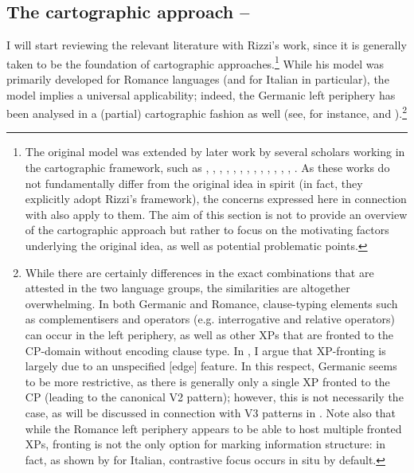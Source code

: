 \subsection{The cartographic approach -- \citet{rizzi1997, rizzi2004}} \label{sec:2rizzi}
I will start reviewing the relevant literature with Rizzi's work, since it is generally taken to be the foundation of cartographic approaches.\footnote{The original model was extended by later work by several scholars working in the cartographic framework, such as \citet{frascarelli2000, frascarelli2008}, \citet{paoli2003diss, paoli2007}, \citet{benincapoletto2004}, \citet{polettopollock2004}, \citet{beninca2006}, \citet{frascarellihinterhoelzl2007}, \citet{cinquerizzi2008, cinquerizzi2009}, \citet{bocci2013}, \citet{polettozanuttini2013}, \citet{bianchiboccicruschina2017, bianchiboccicruschina2018}, \citet{boccicruschina2018}, \citet{rizzibocci2017}, \citet{boccicruschinarizzi2021}, \citet{boccibianchicruschina2021}. As these works do not fundamentally differ from the original idea in spirit (in fact, they explicitly adopt Rizzi's framework), the concerns expressed here in connection with \citet{rizzi1997, rizzi2004} also apply to them. The aim of this section is not to provide an overview of the cartographic approach but rather to focus on the motivating factors underlying the original idea, as well as potential problematic points.} While his model was primarily developed for Romance languages (and for Italian in particular), the model implies a universal applicability; indeed, the Germanic left periphery has been analysed in a (partial) cartographic fashion as well (see, for instance, \citealt{haegeman2007, haegeman2012, haegeman2013, haegeman2014, haegeman2017} and \citealt{hinterhoelzlpetrova2010, hinterhoelzlpetrova2010focus}).\footnote{While there are certainly differences in the exact combinations that are attested in the two language groups, the similarities are altogether overwhelming. In both Germanic and Romance, clause-typing elements such as complementisers and operators (e.g. interrogative and relative operators) can occur in the left periphery, as well as other XPs that are fronted to the CP-domain without encoding clause type. In , I argue that XP-fronting is largely due to an unspecified [edge] feature. In this respect, Germanic seems to be more restrictive, as there is generally only a single XP fronted to the CP (leading to the canonical V2 pattern); however, this is not necessarily the case, as will be discussed in connection with V3 patterns in . Note also that while the Romance left periphery appears to be able to host multiple fronted XPs, fronting is not the only option for marking information structure: in fact, as shown by \citet{sameklodovici2015} for Italian, contrastive focus occurs in situ by default.}

